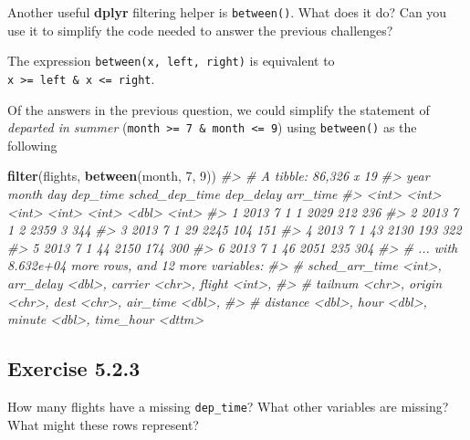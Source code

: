 \documentclass[]{book}
\newenvironment{Shaded}{\begin{snugshade}}{\end{snugshade}}
\newcommand{\CommentTok}[1]{\textcolor[rgb]{0.56,0.35,0.01}{\textit{#1}}}
\newcommand{\DecValTok}[1]{\textcolor[rgb]{0.00,0.00,0.81}{#1}}
\newcommand{\KeywordTok}[1]{\textcolor[rgb]{0.13,0.29,0.53}{\textbf{#1}}}
\newcommand{\NormalTok}[1]{#1}
\theoremstyle{plain}
\theoremstyle{remark}
\theoremstyle{definition}
\theoremstyle{definition}
\theoremstyle{definition}
\theoremstyle{remark}
\begin{document}
Another useful \textbf{dplyr} filtering helper is \texttt{between()}.
What does it do? Can you use it to simplify the code needed to answer
the previous challenges?

The expression \texttt{between(x,\ left,\ right)} is equivalent to
\texttt{x\ \textgreater{}=\ left\ \&\ x\ \textless{}=\ right}.

Of the answers in the previous question, we could simplify the statement
of \emph{departed in summer}
(\texttt{month\ \textgreater{}=\ 7\ \&\ month\ \textless{}=\ 9}) using
\texttt{between()} as the following

\begin{Shaded}
\begin{Highlighting}[]
\KeywordTok{filter}\NormalTok{(flights, }\KeywordTok{between}\NormalTok{(month, }\DecValTok{7}\NormalTok{, }\DecValTok{9}\NormalTok{))}
\CommentTok{#> # A tibble: 86,326 x 19}
\CommentTok{#>    year month   day dep_time sched_dep_time dep_delay arr_time}
\CommentTok{#>   <int> <int> <int>    <int>          <int>     <dbl>    <int>}
\CommentTok{#> 1  2013     7     1        1           2029       212      236}
\CommentTok{#> 2  2013     7     1        2           2359         3      344}
\CommentTok{#> 3  2013     7     1       29           2245       104      151}
\CommentTok{#> 4  2013     7     1       43           2130       193      322}
\CommentTok{#> 5  2013     7     1       44           2150       174      300}
\CommentTok{#> 6  2013     7     1       46           2051       235      304}
\CommentTok{#> # ... with 8.632e+04 more rows, and 12 more variables:}
\CommentTok{#> #   sched_arr_time <int>, arr_delay <dbl>, carrier <chr>, flight <int>,}
\CommentTok{#> #   tailnum <chr>, origin <chr>, dest <chr>, air_time <dbl>,}
\CommentTok{#> #   distance <dbl>, hour <dbl>, minute <dbl>, time_hour <dttm>}
\end{Highlighting}
\end{Shaded}

\hypertarget{exercise-5.2.3}{%
\subsection*{\texorpdfstring{Exercise
{5.2.3}}{Exercise 5.2.3}}\label{exercise-5.2.3}}

How many flights have a missing \texttt{dep\_time}? What other variables
are missing? What might these rows represent?
\end{document}
